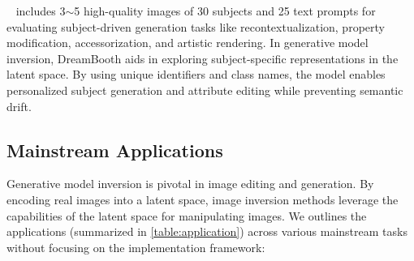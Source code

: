 ~\cite{DreamBooth}
includes 3$\sim$5 high-quality images of 30 subjects and 25 text prompts for evaluating subject-driven generation tasks like recontextualization, property modification, accessorization, and artistic rendering. In generative model inversion, DreamBooth aids in exploring subject-specific representations in the latent space. By using unique identifiers and class names, the model enables personalized subject generation and attribute editing while preventing semantic drift. 

\subsection{Mainstream Applications}
Generative model inversion is pivotal in image editing and generation. By encoding real images into a latent space, image inversion methods leverage the capabilities of the latent space for manipulating images. We outlines the applications (summarized in \cref{table:application}) across various mainstream tasks without focusing on the implementation framework:


